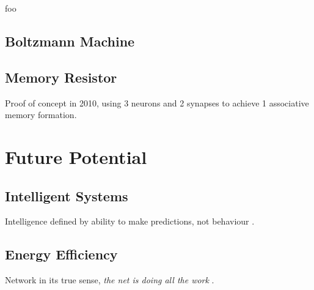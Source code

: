 \documentclass[12pt, a4paper]{article}
\begin{document}

foo

\subsection{Boltzmann Machine}



\subsection{Memory Resistor}


Proof of concept in 2010, using 3 neurons and 2 synapses to achieve 1 associative memory formation.


\section{Future Potential}

\subsection{Intelligent Systems}

Intelligence defined by ability to make predictions, not behaviour \cite{intelligence_is_prediction}.

\subsection{Energy Efficiency}

Network in its true sense, \textit{the net is doing all the work} \cite{net_doing_all_the_work}.

\end{document}
